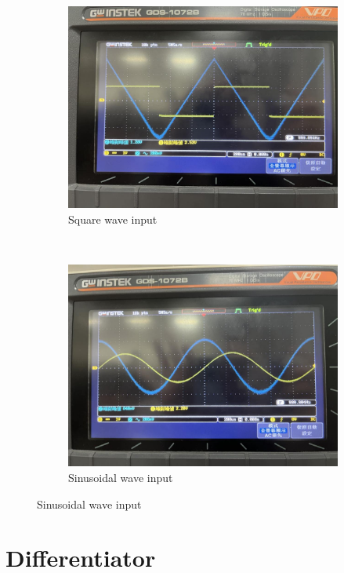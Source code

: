 \documentclass{article}
\begin{document}
\begin{CJK*}{UTF8}{bkai}
\begin{figure}[h]
\begin{center}
    \begin{subfigure}[b]{0.3\textwidth}
        \includegraphics[width=\textwidth]{int_square.jpg}
        \caption{Square wave input}
    \end{subfigure}
    ~
    \begin{subfigure}[b]{0.3\textwidth}
        \includegraphics[width=\textwidth]{int_sin.jpg}
        \caption{Sinusoidal wave input}
    \end{subfigure}
\end{center}   
\end{figure}


\section{Differentiator}



\end{CJK*}
\end{document}
